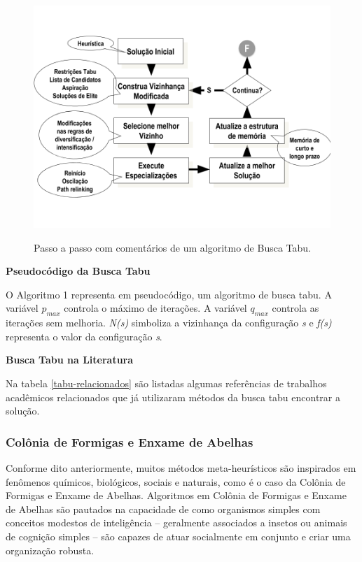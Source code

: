 \begin{figure}[H]
  \centering
  \caption{Passo a passo com comentários de um algoritmo de Busca Tabu.}
 \includegraphics[scale=0.4]{imagens/tabu.png} \par
\bigskip
    \cite[p. 97]{goldbarg}
    \label{taboo-image}
\end{figure}


\textbf{Pseudocódigo da Busca Tabu} \par

O Algoritmo 1 representa em pseudocódigo, um algoritmo de busca tabu. A variável $p_{max}$ controla o máximo de iterações. A variável $q_{max}$ controla as iterações sem melhoria. \emph{N(s)} simboliza a vizinhança da configuração \emph{s} e \emph{f(s)} representa o valor da configuração \emph{s}.



\textbf{Busca Tabu na Literatura} \par
Na tabela \ref{tabu-relacionados} são listadas algumas referências de trabalhos acadêmicos relacionados que já utilizaram métodos da busca tabu encontrar a solução.



\subsubsection{Colônia de Formigas e Enxame de Abelhas}
Conforme dito anteriormente, muitos métodos meta-heurísticos são inspirados em fenômenos químicos, biológicos, sociais e naturais, como é o caso da Colônia de Formigas e Enxame de Abelhas. Algoritmos em Colônia de Formigas e Enxame de Abelhas são pautados na capacidade de como organismos simples com conceitos modestos de inteligência -- geralmente associados a insetos ou animais de cognição simples -- são capazes de atuar socialmente em conjunto e criar uma organização robusta.

